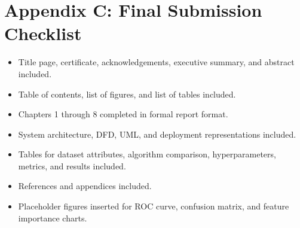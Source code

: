 \section*{Appendix C: Final Submission Checklist}
\begin{itemize}
    \item Title page, certificate, acknowledgements, executive summary, and abstract included.
    \item Table of contents, list of figures, and list of tables included.
    \item Chapters 1 through 8 completed in formal report format.
    \item System architecture, DFD, UML, and deployment representations included.
    \item Tables for dataset attributes, algorithm comparison, hyperparameters, metrics, and results included.
    \item References and appendices included.
    \item Placeholder figures inserted for ROC curve, confusion matrix, and feature importance charts.
\end{itemize}
